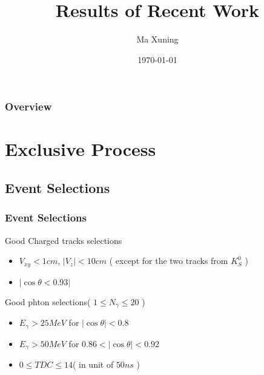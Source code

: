 \documentclass{beamer}
\title[Short title]{Results of Recent Work} %
\author{Ma Xuning} %
\institute[N.K.U] %
{
Nankai University\\ %
\medskip
\textit{maxn@ihep.ac.cn} %
}
\date{\today} %
\begin{document}
\begin{frame}
\titlepage %
\end{frame}

\begin{frame}
\frametitle{Overview} %
\tableofcontents %
\end{frame}


\section{Exclusive Process} %
\subsection{Event Selections}
\begin{frame}
\frametitle{Event Selections}
\begin{block}{Good Charged tracks selections}
\begin{itemize}
\item $V_{xy} < 1 cm$, $ | V_z | < 10 cm$ ( except for the two tracks from $K_S^0$ )
\item $|\cos\theta < 0.93 |$
\end{itemize}
\end{block}
\begin{block}{Good phton selections( $1\leq N_{\gamma}\leq 20$ )}
\begin{itemize}
\item $E_{\gamma} > 25 MeV$ for $|\cos\theta| < 0.8$
\item $E_{\gamma} > 50 MeV$ for $0.86<|\cos\theta|<0.92$
\item $0\leq TDC\leq 14 $( in unit of $50ns$ )
\end{itemize}
\end{block}
\end{frame}
\end{document}
